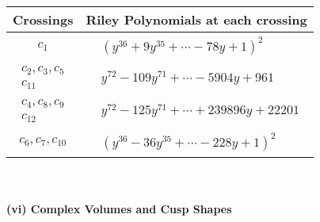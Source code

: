 \documentclass[1p]{elsarticle_modified}
\theoremstyle{definition}
\begin{document}
\begin{tabular}{m{50pt}|m{274pt}}
Crossings & \hspace{64pt}Riley Polynomials at each crossing \\
\hline $$\begin{aligned}c_{1}\end{aligned}$$&$\begin{aligned}
&(y^{36}+9 y^{35}+\cdots-78 y+1)^{2}
\end{aligned}$\\
\hline $$\begin{aligned}c_{2},c_{3},c_{5}\\c_{11}\end{aligned}$$&$\begin{aligned}
&y^{72}-109 y^{71}+\cdots-5904 y+961
\end{aligned}$\\
\hline $$\begin{aligned}c_{4},c_{8},c_{9}\\c_{12}\end{aligned}$$&$\begin{aligned}
&y^{72}-125 y^{71}+\cdots+239896 y+22201
\end{aligned}$\\
\hline $$\begin{aligned}c_{6},c_{7},c_{10}\end{aligned}$$&$\begin{aligned}
&(y^{36}-36 y^{35}+\cdots-228 y+1)^{2}
\end{aligned}$\\
\hline
\end{tabular}\\~\\
\newpage\flushleft \textbf{(vi) Complex Volumes and Cusp Shapes}
\end{document}
